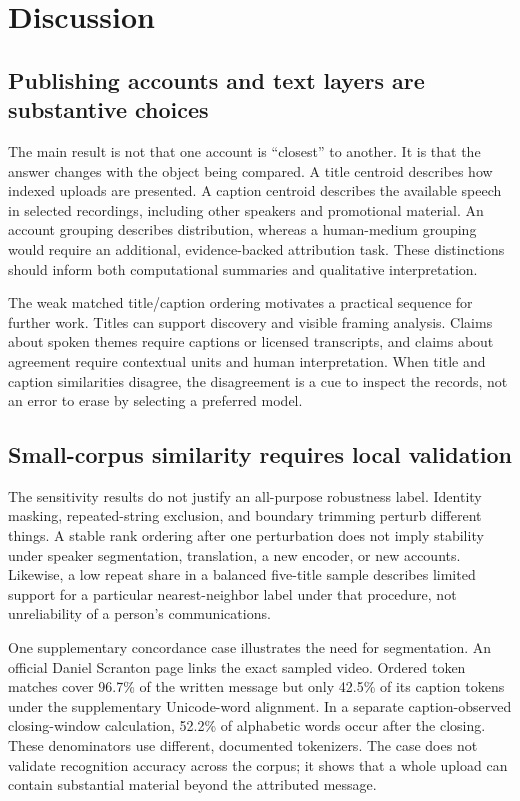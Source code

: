 \section{Discussion}
\subsection{Publishing accounts and text layers are substantive choices}
The main result is not that one account is ``closest'' to another. It is that the answer changes with the object being compared. A title centroid describes how indexed uploads are presented. A caption centroid describes the available speech in selected recordings, including other speakers and promotional material. An account grouping describes distribution, whereas a human-medium grouping would require an additional, evidence-backed attribution task. These distinctions should inform both computational summaries and qualitative interpretation.

The weak matched title/caption ordering motivates a practical sequence for further work. Titles can support discovery and visible framing analysis. Claims about spoken themes require captions or licensed transcripts, and claims about agreement require contextual units and human interpretation. When title and caption similarities disagree, the disagreement is a cue to inspect the records, not an error to erase by selecting a preferred model.

\subsection{Small-corpus similarity requires local validation}
The sensitivity results do not justify an all-purpose robustness label. Identity masking, repeated-string exclusion, and boundary trimming perturb different things. A stable rank ordering after one perturbation does not imply stability under speaker segmentation, translation, a new encoder, or new accounts. Likewise, a low repeat share in a balanced five-title sample describes limited support for a particular nearest-neighbor label under that procedure, not unreliability of a person's communications.

One supplementary concordance case illustrates the need for segmentation. An official Daniel Scranton page links the exact sampled video. Ordered token matches cover 96.7\% of the written message but only 42.5\% of its caption tokens under the supplementary Unicode-word alignment. In a separate caption-observed closing-window calculation, 52.2\% of alphabetic words occur after the closing. These denominators use different, documented tokenizers. The case does not validate recognition accuracy across the corpus; it shows that a whole upload can contain substantial material beyond the attributed message.

